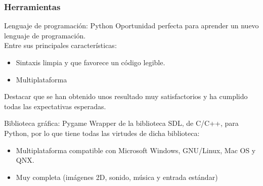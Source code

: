 \begin{frame}
    \frametitle{Herramientas}

        \begin{block}{Lenguaje de programación: Python}
        Oportunidad perfecta para aprender un nuevo lenguaje de programación.\\
        Entre sus principales características:
            \begin{itemize}
                \item Sintaxis limpia y que favorece un código legible.
                \item Multiplataforma
            \end{itemize}
        Destacar que se han obtenido unos resultado muy satisfactorios y ha cumplido todas las expectativas esperadas.

        \end{block}

        \begin{block}{Biblioteca gráfica: Pygame}
        Wrapper de la biblioteca SDL, de C/C++, para Python, por lo que tiene todas las virtudes de dicha biblioteca:
            \begin{itemize}
                \item Multiplataforma compatible con Microsoft Windows, GNU/Linux, Mac OS y QNX.
                \item Muy completa (imágenes 2D, sonido, música y entrada estándar)
            \end{itemize}
        \end{block}

\end{frame}

